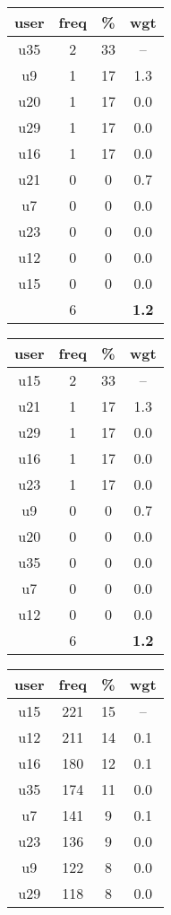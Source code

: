 \begin{appendices}
\begin{table}
\begin{tabular}{ |c|c|c|c| }
	\hline
	\textbf{user} & \textbf{freq} & \textbf{\%} & \textbf{wgt} \\
	\hline
	u35 & 2 & 33 & -- \\
	u9 & 1 & 17 & 1.3 \\
	u20 & 1 & 17 & 0.0 \\
	u29 & 1 & 17 & 0.0 \\
	u16 & 1 & 17 & 0.0 \\
	u21 & 0 & 0 & 0.7 \\
	u7 & 0 & 0 & 0.0 \\
	u23 & 0 & 0 & 0.0 \\
	u12 & 0 & 0 & 0.0 \\
	u15 & 0 & 0 & 0.0 \\
	 & 6 & & \textbf{1.2} \\
	\hline
\end{tabular}
\begin{tabular}{ |c|c|c|c| }
	\hline
	\textbf{user} & \textbf{freq} & \textbf{\%} & \textbf{wgt} \\
	\hline
	u15 & 2 & 33 & -- \\
	u21 & 1 & 17 & 1.3 \\
	u29 & 1 & 17 & 0.0 \\
	u16 & 1 & 17 & 0.0 \\
	u23 & 1 & 17 & 0.0 \\
	u9 & 0 & 0 & 0.7 \\
	u20 & 0 & 0 & 0.0 \\
	u35 & 0 & 0 & 0.0 \\
	u7 & 0 & 0 & 0.0 \\
	u12 & 0 & 0 & 0.0 \\
	 & 6 & & \textbf{1.2} \\
	\hline
\end{tabular}
\begin{tabular}{ |c|c|c|c| }
	\hline
	\textbf{user} & \textbf{freq} & \textbf{\%} & \textbf{wgt} \\
	\hline
	u15 & 221 & 15 & -- \\
	u12 & 211 & 14 & 0.1 \\
	u16 & 180 & 12 & 0.1 \\
	u35 & 174 & 11 & 0.0 \\
	u7 & 141 & 9 & 0.1 \\
	u23 & 136 & 9 & 0.0 \\
	u9 & 122 & 8 & 0.0 \\
	u29 & 118 & 8 & 0.0 \\

\end{tabular}
\end{table}
\end{appendices}
